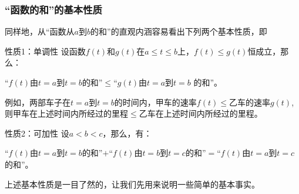 \subsubsection{“函数的和”的基本性质}

同样地，从“函数从$a$到$b$的和”的直观内涵容易看出下列两个基本性质，即

\begin{blk}{性质1：单调性}
设函数$f(t)$和$g(t)$在$a\le t\le b$上，$f(t)\le g(t)$恒成立，那么：

“$f(t)$由$t=a$到$t=b$的和”$\le $“$g(t)$由$t=a$到$t=b$
的和”。
\end{blk}

例如，两部车子在$t=a$到$t=b$的时间内，甲车的速率$f(t)\le $乙车的速率$g(t)$, 则甲车在上述时间内所经过的里程$\le $乙车在上述时间内所经过的里程。

\begin{blk}{性质2：可加性}
设$a<b<c$，那么，有：

“$f(t)$由$t=a$到$t=b$的和”$+$“$f(t)$由$t=b$到$t=c$的和”$=$“$f(t)$由$t=a$到$t=c$的和”。
\end{blk}

上述基本性质是一目了然的，让我们先用来说明一些简单的基本事实。

